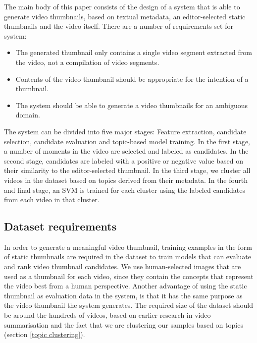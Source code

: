 \documentclass{../resources/sig-alternate-05-2015}
\begin{document}
The main body of this paper consists of the design of a system that is able to generate video thumbnails, based on textual metadata, an editor-selected static thumbnails and the video itself. There are a number of requirements set for system:

\begin{itemize}
	\item The generated thumbnail only contains a single video segment extracted from the video, not a compilation of video segments.
	\item Contents of the video thumbnail should be appropriate for the intention of a thumbnail.
	\item The system should be able to generate a video thumbnails for an ambiguous domain.
\end{itemize}

The system can be divided into five major stages: Feature extraction, candidate selection, candidate evaluation and topic-based model training. In the first stage, a number of moments in the video are selected and labeled as candidates. In the second stage, candidates are labeled with a positive or negative value based on their similarity to the editor-selected thumbnail. In the third stage, we cluster all videos in the dataset based on topics derived from their metadata. In the fourth and final stage, an SVM is trained for each cluster using the labeled candidates from each video in that cluster.

\subsection{Dataset requirements}
\label{dataset requirements}
In order to generate a meaningful video thumbnail, training examples in the form of static thumbnails are required in the dataset to train models that can evaluate and rank video thumbnail candidates. We use human-selected images that are used as a thumbnail for each video, since they contain the concepts that represent the video best from a human perspective. Another advantage of using the static thumbnail as evaluation data in the system, is that it has the same purpose as the video thumbnail the system generates. The required size of the dataset should be around the hundreds of videos, based on earlier research in video summarisation \cite{Almeida:2012be,Christel:2004in,Money:2008fn} and the fact that we are clustering our samples based on topics (section \ref{topic clustering}).
\end{document}
